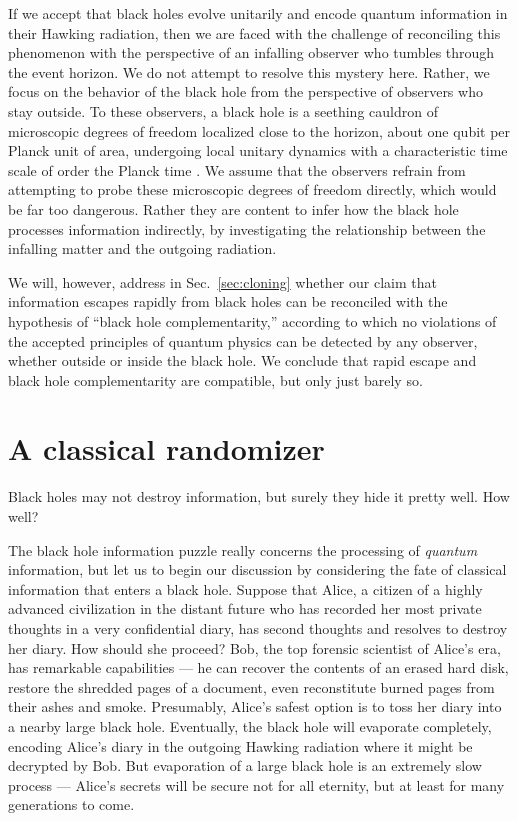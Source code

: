 \documentclass[11pt]{article}
\begin{document}
If we accept that black holes evolve unitarily and encode quantum information in their Hawking radiation, then we are faced with the challenge of reconciling this phenomenon with the perspective of an infalling observer who tumbles through the event horizon. We do not attempt to resolve this mystery here. Rather, we focus on the behavior of the black hole from the perspective of observers who stay outside. To these observers, a black hole is a seething cauldron of microscopic degrees of freedom localized close to the horizon, about one qubit per Planck unit of area, undergoing local unitary dynamics with a characteristic time scale of order the Planck time \cite{complement,susskind-book}. We assume that the observers refrain from attempting to probe these microscopic degrees of freedom directly, which would be far too dangerous. Rather they are content to infer how the black hole processes information indirectly, by investigating the relationship between the infalling matter and the outgoing radiation.

We will, however, address in Sec.~\ref{sec:cloning} whether our claim that information escapes rapidly from black holes can be reconciled with the hypothesis of ``black hole complementarity,'' according to which no violations of the accepted principles of quantum physics can be detected by any observer, whether outside or inside the black hole. We conclude that rapid escape and black hole complementarity are compatible, but only just barely so.

\section{A classical randomizer}
\label{sec:classical}
Black holes may not destroy information, but surely they hide it pretty well. How well?

The black hole information puzzle really concerns the processing of {\em quantum} information, but let us to begin our discussion by considering the fate of classical information that enters a black hole. Suppose that Alice, a citizen of a highly advanced civilization in the distant future who has recorded her most private thoughts in a very confidential diary, has second thoughts and resolves to destroy her diary. How should she proceed? Bob, the top forensic scientist of Alice's era, has remarkable capabilities --- he can recover the contents of an erased hard disk, restore the shredded pages of a document, even reconstitute  burned pages from their ashes and smoke. Presumably, Alice's safest option is to toss her diary into a nearby large black hole. Eventually, the black hole will evaporate completely, encoding Alice's diary in the outgoing Hawking radiation where it might be decrypted by Bob. But evaporation of a large black hole is an extremely slow process --- Alice's secrets will be secure not for all eternity, but at least for many generations to come.
\end{document}
